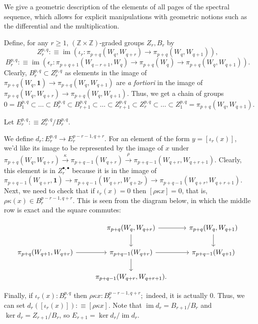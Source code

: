 \documentclass{amsart}
\theoremstyle{definition}
\newcommand{\ZZ}{\mathbb{Z}}
\newcommand{\im}{\operatorname{im}}
\newcommand{\sgtn}{\mathbf{1}}
\begin{document}
We give a geometric description of the elements of all pages of the spectral sequence, which allows for explicit manipulations with geometric notions such as the differential and the multiplication.

Define, for any $r \geq 1$, $(\ZZ\times\ZZ)$-graded groups $Z_r, B_r$ by
$$Z^{p,q}_r : \equiv \im (\iota_r: \pi_{p+q}(W_q, W_{q+r}) \to \pi_{p+q}(W_q, W_{q+1})),$$
$$B^{p,q}_r : \equiv \im (\epsilon_r: \pi_{p+q+1}(W_{q-r+1}, W_q) \to \pi_{p+q}(W_q) \to \pi_{p+q}(W_q, W_{q+1})).$$ Clearly, $B_r^{p,q} \subset Z_r^{p,q}$ as elements in the image of $\pi_{p+q}(W_q, \sgtn) \to \pi_{p+q}(W_q, W_{q+1})$ are \textit{a fortiori} in the image of $\pi_{p+q}(W_q, W_{q+r}) \to \pi_{p+q}(W_q, W_{q+1})$. Thus, we get a chain of groups $0 = B^{p,q}_1 \subset \ldots \subset B^{p,q}_r \subset B^{p,q}_{r+1} \subset \ldots \subset Z^{p,q}_{r+1} \subset Z^{p,q}_{r} \subset \ldots \subset Z^{p,q}_1 = \pi_{p+q
}(W_q, W_{q+1}).$

Let $E_r^{p,q} : \equiv Z_r^{p,q} / B_r^{p,q}.$


We define $d_{r}: E^{p,q}_{r} \to E^{p-r-1,q+r}_{r}.$ For an element of the form $y = [\iota_r(x)]$, we'd like its image to be represented by the image of $x$ under $\pi_{p+q}({W_{q}, W_{q+r}})\xrightarrow{\kappa} \pi_{p+q-1}({W_{q+r}}) \xrightarrow{\rho} \pi_{p+q-1}({W_{q+r}, W_{q+r+1}})$. Clearly, this element is in $Z^{\bullet,\bullet}_r$ because it is in the image of $\pi_{p+q-1}(W_{q+r}, \sgtn) \to \pi_{p+q-1}(W_{q+r}, W_{q+2r}) \to \pi_{p+q-1}(W_{q+r}, W_{q+r+1}).$
Next, we need to check that if $\iota_r (x) = 0 $ then $[\rho \kappa x] = 0$, that is, $\rho \kappa (x) \in B_r^{{p-r-1, q+r}}.$ This is seen from the diagram below, in which the middle row is exact and the square commutes:

\begin{equation}\label{eq:d-well-defined}
\begin{tikzcd}
	& {\pi_{p+q}(W_q, W_{q+r})} & {\pi_{p+q}(W_q, W_{q+1})} \\
	{\pi_{p+q}(W_{q+1}, W_{q+r})} & {\pi_{p+q-1}(W_{q+r})} & {\pi_{p+q-1}(W_{q+1})} \\
	& {\pi_{p+q-1}(W_{q+r}, W_{q+r+1}).}
	\arrow[from=1-2, to=1-3]
	\arrow[from=1-2, to=2-2]
	\arrow[from=1-3, to=2-3]
	\arrow[from=2-2, to=2-3]
	\arrow[from=2-1, to=2-2]
	\arrow[from=2-2, to=3-2]
\end{tikzcd}
\end{equation}

Finally, if $\iota_r(x) : B_r^{p,q}$ then $\rho \kappa x : B_r^{p-r-1,q+r};$ indeed, it is actually $0$.
Thus, we can set $d_r([\iota_r(x)]) :\equiv [\rho \kappa x].$ Note that $\im d_r = B_{r+1}/B_{r}$ and $\ker d_r = Z_{r+1}/B_r$, so $E_{r+1} = \ker d_r / \im d_r.$
\end{document}
